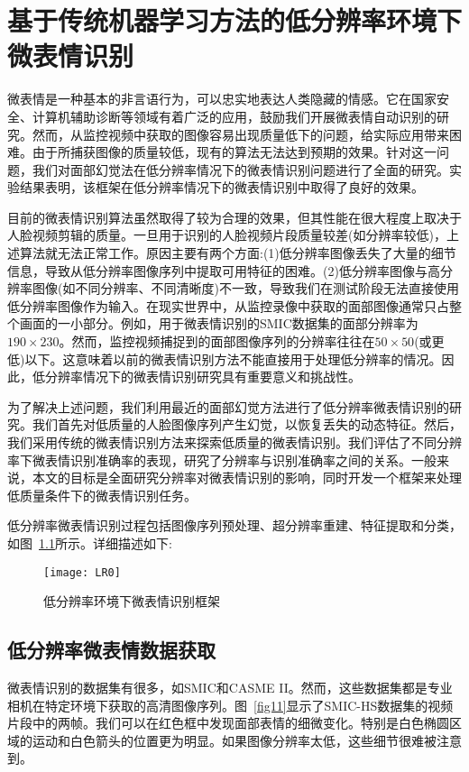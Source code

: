\chapter{基于传统机器学习方法的低分辨率环境下微表情识别}\label{chap:owner1}

微表情是一种基本的非言语行为，可以忠实地表达人类隐藏的情感。它在国家安全、计算机辅助诊断等领域有着广泛的应用，鼓励我们开展微表情自动识别的研究。然而，从监控视频中获取的图像容易出现质量低下的问题，给实际应用带来困难。由于所捕获图像的质量较低，现有的算法无法达到预期的效果。针对这一问题，我们对面部幻觉法在低分辨率情况下的微表情识别问题进行了全面的研究。实验结果表明，该框架在低分辨率情况下的微表情识别中取得了良好的效果。

目前的微表情识别算法虽然取得了较为合理的效果，但其性能在很大程度上取决于人脸视频剪辑的质量。一旦用于识别的人脸视频片段质量较差(如分辨率较低)，上述算法就无法正常工作。原因主要有两个方面:(1)低分辨率图像丢失了大量的细节信息，导致从低分辨率图像序列中提取可用特征的困难\citep{lei2011local}。(2)低分辨率图像与高分辨率图像(如不同分辨率、不同清晰度)不一致，导致我们在测试阶段无法直接使用低分辨率图像作为输入。在现实世界中，从监控录像中获取的面部图像通常只占整个画面的一小部分。例如，用于微表情识别的SMIC数据集的面部分辨率为$190\times230$。然而，监控视频捕捉到的面部图像序列的分辨率往往在$50\times50$(或更低)以下。这意味着以前的微表情识别方法不能直接用于处理低分辨率的情况。因此，低分辨率情况下的微表情识别研究具有重要意义和挑战性。

为了解决上述问题，我们利用最近的面部幻觉方法进行了低分辨率微表情识别的研究。我们首先对低质量的人脸图像序列产生幻觉，以恢复丢失的动态特征。然后，我们采用传统的微表情识别方法来探索低质量的微表情识别。我们评估了不同分辨率下微表情识别准确率的表现，研究了分辨率与识别准确率之间的关系。一般来说，本文的目标是全面研究分辨率对微表情识别的影响，同时开发一个框架来处理低质量条件下的微表情识别任务。

低分辨率微表情识别过程包括图像序列预处理、超分辨率重建、特征提取和分类，如图~\ref{fig10}所示。详细描述如下:

\begin{figure}[!htbp]
    \centering
    \texttt{[image: LR0]}
    \caption{低分辨率环境下微表情识别框架}
    \label{fig10}
\end{figure}

\section{低分辨率微表情数据获取}

微表情识别的数据集有很多，如SMIC和CASME II。然而，这些数据集都是专业相机在特定环境下获取的高清图像序列。图~\ref{fig11}显示了SMIC-HS数据集的视频片段中的两帧。我们可以在红色框中发现面部表情的细微变化。特别是白色椭圆区域的运动和白色箭头的位置更为明显。如果图像分辨率太低，这些细节很难被注意到。

